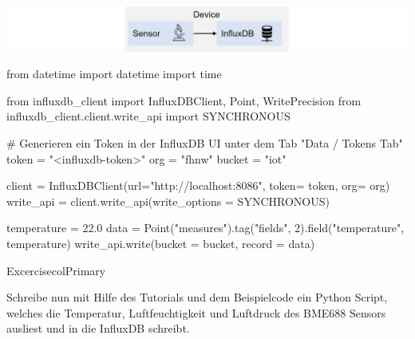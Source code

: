 \documentclass[
  11pt,
  a4paper,
  oneside, openany  ,captions=tableheading
]{scrbook}
\newenvironment{Shaded}{\begin{snugshade}}{\end{snugshade}}
\newcommand{\CommentTok}[1]{\textcolor[rgb]{0.37,0.37,0.37}{#1}}
\newcommand{\DecValTok}[1]{\textcolor[rgb]{0.68,0.00,0.00}{#1}}
\newcommand{\FloatTok}[1]{\textcolor[rgb]{0.68,0.00,0.00}{#1}}
\newcommand{\ImportTok}[1]{\textcolor[rgb]{0.00,0.46,0.62}{#1}}
\newcommand{\NormalTok}[1]{\textcolor[rgb]{0.00,0.23,0.31}{#1}}
\newcommand{\OperatorTok}[1]{\textcolor[rgb]{0.37,0.37,0.37}{#1}}
\newcommand{\StringTok}[1]{\textcolor[rgb]{0.13,0.47,0.30}{#1}}
\theoremstyle{remark}
\begin{document}
\includegraphics{images/mqtt-sensor-influxdb.jpg}

\begin{Shaded}
\begin{Highlighting}[]
\ImportTok{from}\NormalTok{ datetime }\ImportTok{import}\NormalTok{ datetime}
\ImportTok{import}\NormalTok{ time}

\ImportTok{from}\NormalTok{ influxdb\_client }\ImportTok{import}\NormalTok{ InfluxDBClient, Point, WritePrecision}
\ImportTok{from}\NormalTok{ influxdb\_client.client.write\_api }\ImportTok{import}\NormalTok{ SYNCHRONOUS}

\CommentTok{\# Generieren ein Token in der InfluxDB UI unter dem Tab "Data / Tokens Tab"}
\NormalTok{token }\OperatorTok{=} \StringTok{"\textless{}influxdb{-}token\textgreater{}"}
\NormalTok{org }\OperatorTok{=} \StringTok{"fhnw"}
\NormalTok{bucket }\OperatorTok{=} \StringTok{"iot"}

\NormalTok{client }\OperatorTok{=}\NormalTok{ InfluxDBClient(url}\OperatorTok{=}\StringTok{"http://localhost:8086"}\NormalTok{, token}\OperatorTok{=}\NormalTok{ token, org}\OperatorTok{=}\NormalTok{ org)}
\NormalTok{write\_api }\OperatorTok{=}\NormalTok{ client.write\_api(write\_options }\OperatorTok{=}\NormalTok{ SYNCHRONOUS)}

\NormalTok{temperature }\OperatorTok{=} \FloatTok{22.0}
\NormalTok{data }\OperatorTok{=}\NormalTok{ Point(}\StringTok{"measures"}\NormalTok{).tag(}\StringTok{"fields"}\NormalTok{, }\DecValTok{2}\NormalTok{).field(}\StringTok{"temperature"}\NormalTok{, temperature)}
\NormalTok{write\_api.write(bucket }\OperatorTok{=}\NormalTok{ bucket, record }\OperatorTok{=}\NormalTok{ data)}
\end{Highlighting}
\end{Shaded}

\begin{boxtitle}{Excercise}{colPrimary}

Schreibe nun mit Hilfe des Tutorials und dem Beispielcode ein Python
Script, welches die Temperatur, Luftfeuchtigkeit und Luftdruck des
BME688 Sensors ausliest und in die InfluxDB schreibt.

\end{boxtitle}

\cleardoublepage
{}
{}
\appendix
\end{document}
